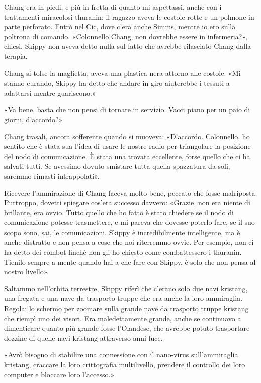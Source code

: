 \hfill\break

Chang era in piedi, e più in fretta di quanto mi aspettassi, anche con i
trattamenti miracolosi thuranin: il ragazzo aveva le costole rotte e un
polmone in parte perforato. Entrò nel Cic, dove c'era anche Simms,
mentre io ero sulla poltrona di comando. «Colonnello Chang, non dovrebbe
essere in infermeria?», chiesi. Skippy non aveva detto nulla sul fatto
che avrebbe rilasciato Chang dalla terapia.

Chang si tolse la maglietta, aveva una plastica nera attorno alle
costole. «Mi stanno curando, Skippy ha detto che andare in giro
aiuterebbe i tessuti a adattarsi mentre guariscono.»

«Va bene, basta che non pensi di tornare in servizio. Vacci piano per un
paio di giorni, d'accordo?»

Chang trasalì, ancora sofferente quando si muoveva: «D'accordo.
Colonnello, ho sentito che è stata sua l'idea di usare le nostre radio
per triangolare la posizione del nodo di comunicazione. È stata una
trovata eccellente, forse quello che ci ha salvati tutti. Se avessimo
dovuto smistare tutta quella spazzatura da soli, saremmo rimasti
intrappolati».

Ricevere l'ammirazione di Chang faceva molto bene, peccato che fosse
malriposta. Purtroppo, dovetti spiegare cos'era successo davvero:
«Grazie, non era niente di brillante, era ovvio. Tutto quello che ho
fatto è stato chiedere se il nodo di comunicazione potesse trasmettere,
e mi pareva che dovesse poterlo fare, se il suo scopo sono, sai, le
comunicazioni. Skippy è incredibilmente intelligente, ma è anche
distratto e non pensa a cose che noi riterremmo ovvie. Per esempio, non
ci ha detto dei combot finché non gli ho chiesto come combattessero i
thuranin. Tienilo sempre a mente quando hai a che fare con Skippy, è
solo che non pensa al nostro livello».

\hfill\break

Saltammo nell'orbita terrestre, Skippy riferì che c'erano solo due navi
kristang, una fregata e una nave da trasporto truppe che era anche la
loro ammiraglia. Regolai lo schermo per zoomare sulla grande nave da
trasporto truppe kristang che riempì uno dei visori. Era maledettamente
grande, anche se continuavo a dimenticare quanto più grande fosse
l'Olandese, che avrebbe potuto trasportare dozzine di quelle navi
kristang attraverso anni luce.

«Avrò bisogno di stabilire una connessione con il nano-virus
sull'ammiraglia kristang, craccare la loro crittografia multilivello,
prendere il controllo dei loro computer e bloccare loro l'accesso.»

